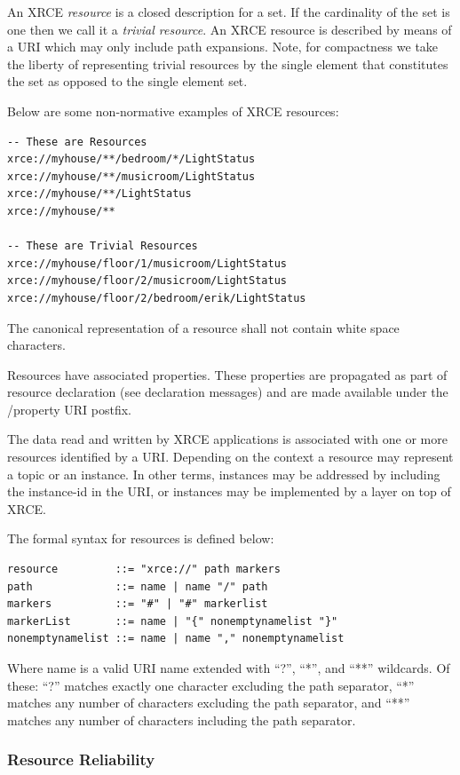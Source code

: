 \documentclass[a4paper,oneside,article]{memoir}
\begin{document}
An XRCE \emph{resource} is a closed description for a set.  If the cardinality of the set is one
then we call it a \emph{trivial resource}.  An XRCE resource is described by means of a URI which
may only include path expansions.  Note, for compactness we take the liberty of representing trivial
resources by the single element that constitutes the set as opposed to the single element set.

Below are some non-normative examples of XRCE resources:
\begin{verbatim}
-- These are Resources
xrce://myhouse/**/bedroom/*/LightStatus 
xrce://myhouse/**/musicroom/LightStatus
xrce://myhouse/**/LightStatus
xrce://myhouse/**

-- These are Trivial Resources
xrce://myhouse/floor/1/musicroom/LightStatus
xrce://myhouse/floor/2/musicroom/LightStatus
xrce://myhouse/floor/2/bedroom/erik/LightStatus
\end{verbatim}

The canonical representation of a resource shall not contain white space characters.

Resources have associated properties.  These properties are propagated as part of resource
declaration (see declaration messages) and are made available under the /property URI postfix.

The data read and written by XRCE applications is associated with one or more resources identified
by a URI.  Depending on the context a resource may represent a topic or an instance.  In other
terms, instances may be addressed by including the instance-id in the URI, or instances may be
implemented by a layer on top of XRCE.

The formal syntax for resources is defined below:
\begin{verbatim}
resource         ::= "xrce://" path markers
path             ::= name | name "/" path 
markers          ::= "#" | "#" markerlist
markerList       ::= name | "{" nonemptynamelist "}"
nonemptynamelist ::= name | name "," nonemptynamelist
\end{verbatim}

Where name is a valid URI name extended with ``?'', ``*'', and ``**'' wildcards.  Of these: ``?''
matches exactly one character excluding the path separator, ``*'' matches any number of characters
excluding the path separator, and ``**'' matches any number of characters including the path
separator.

\subsubsection{Resource Reliability}
\end{document}
